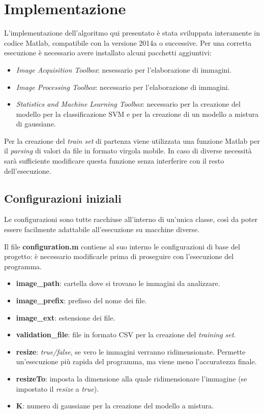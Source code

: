 \section{Implementazione}

L'implementazione dell'algoritmo qui presentato è stata sviluppata interamente in codice Matlab, compatibile con la versione 2014a o successive. 
Per una corretta esecuzione è necessario avere installato alcuni pacchetti aggiuntivi:

\begin{itemize}
\item \emph{Image Acquisition Toolbox}: nesessario per l'elaborazione di immagini.
\item \emph{Image Processing Toolbox}: necessario per l'elaborazione di immagini.
\item \emph{Statistics and Machine Learning Toolbox}: necessario per la creazione del modello per la classificazione SVM e per la creazione di un modello a mistura di gaussiane.
\end{itemize}

Per la creazione del \emph{train set} di partenza viene utilizzata una funzione Matlab per il \emph{parsing} di valori da file in formato virgola mobile. In caso di diverse necessità sarà sufficiente modificare questa funzione senza interferire con il resto dell'esecuzione.

\subsection{Configurazioni iniziali}

Le configurazioni sono tutte racchiuse all'interno di un'unica classe, così da poter essere facilmente adattabile all'esecuzione su macchine diverse. 

Il file \textbf{configuration.m} contiene al suo interno le configurazioni di base del progetto: è necessario modificarle prima di proseguire con l'esecuzione del programma.

\begin{itemize}
\item \textbf{image\_path}: cartella dove si trovano le immagini da analizzare.
\item \textbf{image\_prefix}: prefisso del nome dei file.
\item \textbf{image\_ext}: estensione dei file.
\item \textbf{validation\_file}: file in formato CSV per la creazione del \emph{training set}.
\item \textbf{resize}: \emph{true/false}, se vero le immagini verranno ridimensionate. Permette un'esecuzione più rapida del programma, ma viene meno l'accuratezza finale.
\item \textbf{resizeTo}: imposta la dimensione alla quale ridimensionare l'immagine (se impostato il \emph{resize} a \emph{true}).
\item \textbf{K}: numero di gaussiane per la creazione del modello a mistura.
\end{itemize}

